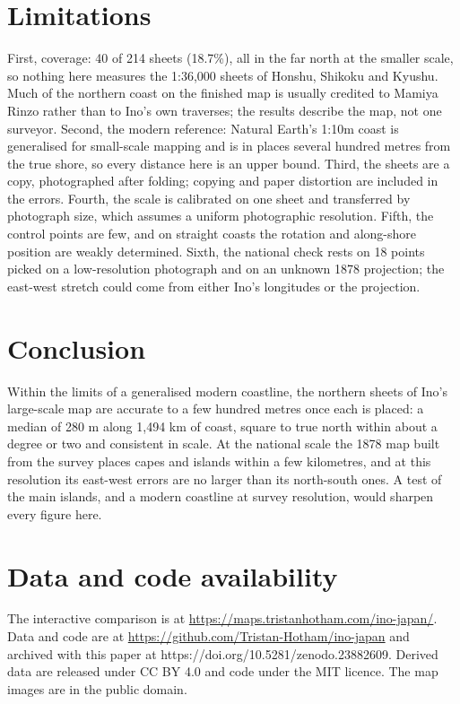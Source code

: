 \documentclass[11pt,a4paper]{article}
\begin{document}
\section{Limitations}
First, coverage: 40 of 214 sheets (18.7\%), all in the far north at the smaller scale, so nothing here measures the 1:36,000 sheets of Honshu, Shikoku and Kyushu. Much of the northern coast on the finished map is usually credited to Mamiya Rinzo rather than to Ino's own traverses; the results describe the map, not one surveyor. Second, the modern reference: Natural Earth's 1:10m coast is generalised for small-scale mapping and is in places several hundred metres from the true shore, so every distance here is an upper bound. Third, the sheets are a copy, photographed after folding; copying and paper distortion are included in the errors. Fourth, the scale is calibrated on one sheet and transferred by photograph size, which assumes a uniform photographic resolution. Fifth, the control points are few, and on straight coasts the rotation and along-shore position are weakly determined. Sixth, the national check rests on 18 points picked on a low-resolution photograph and on an unknown 1878 projection; the east-west stretch could come from either Ino's longitudes or the projection.

\section{Conclusion}
Within the limits of a generalised modern coastline, the northern sheets of Ino's large-scale map are accurate to a few hundred metres once each is placed: a median of 280 m along 1,494 km of coast, square to true north within about a degree or two and consistent in scale. At the national scale the 1878 map built from the survey places capes and islands within a few kilometres, and at this resolution its east-west errors are no larger than its north-south ones. A test of the main islands, and a modern coastline at survey resolution, would sharpen every figure here.

\section*{Data and code availability}
The interactive comparison is at \url{https://maps.tristanhotham.com/ino-japan/}. Data and code are at \url{https://github.com/Tristan-Hotham/ino-japan} and archived with this paper at https://doi.org/10.5281/zenodo.23882609. Derived data are released under CC BY 4.0 and code under the MIT licence. The map images are in the public domain.
\end{document}
